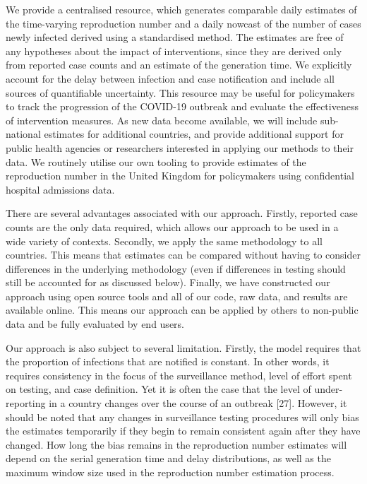 \documentclass[
]{article}
\begin{document}
We provide a centralised resource, which generates comparable daily
estimates of the time-varying reproduction number and a daily nowcast of
the number of cases newly infected derived using a standardised method.
The estimates are free of any hypotheses about the impact of
interventions, since they are derived only from reported case counts and
an estimate of the generation time. We explicitly account for the delay
between infection and case notification and include all sources of
quantifiable uncertainty. This resource may be useful for policymakers
to track the progression of the COVID-19 outbreak and evaluate the
effectiveness of intervention measures. As new data become available, we
will include sub-national estimates for additional countries, and
provide additional support for public health agencies or researchers
interested in applying our methods to their data. We routinely utilise
our own tooling to provide estimates of the reproduction number in the
United Kingdom for policymakers using confidential hospital admissions
data.

There are several advantages associated with our approach. Firstly,
reported case counts are the only data required, which allows our
approach to be used in a wide variety of contexts. Secondly, we apply
the same methodology to all countries. This means that estimates can be
compared without having to consider differences in the underlying
methodology (even if differences in testing should still be accounted
for as discussed below). Finally, we have constructed our approach using
open source tools and all of our code, raw data, and results are
available online. This means our approach can be applied by others to
non-public data and be fully evaluated by end users.

Our approach is also subject to several limitation. Firstly, the model
requires that the proportion of infections that are notified is
constant. In other words, it requires consistency in the focus of the
surveillance method, level of effort spent on testing, and case
definition. Yet it is often the case that the level of under-reporting
in a country changes over the course of an outbreak {[}27{]}. However,
it should be noted that any changes in surveillance testing procedures
will only bias the estimates temporarily if they begin to remain
consistent again after they have changed. How long the bias remains in
the reproduction number estimates will depend on the serial generation
time and delay distributions, as well as the maximum window size used in
the reproduction number estimation process.
\end{document}
